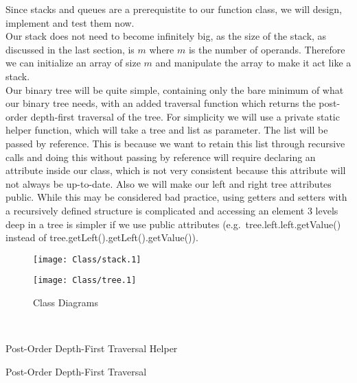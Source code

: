 \documentclass{article}
\newcounter{subsubsubsection}[subsubsection]
\begin{document}
\newpage
{}
Since stacks and queues are a prerequistite to our function class, we will design, implement and test them now.\\
Our stack does not need to become infinitely big, as the size of the stack, as discussed in the last section, is $m$ where $m$ is the number of operands. Therefore we can initialize an array of size $m$ and manipulate the array to make it act like a stack.\\
Our binary tree will be quite simple, containing only the bare minimum of what our binary tree needs, with an added traversal function which returns the post-order depth-first traversal of the tree. For simplicity we will use a private static helper function, which will take a tree and list as parameter. The list will be passed by reference. This is because we want to retain this list through recursive calls and doing this without passing by reference will require declaring an attribute inside our class, which is not very consistent because this attribute will not always be up-to-date. Also we will make our left and right tree attributes public. While this may be considered bad practice, using getters and setters with a recursively defined structure is complicated and accessing an element 3 levels deep in a tree is simpler if we use public attributes (e.g.\ tree.left.left.getValue() instead of tree.getLeft().getLeft().getValue()).\\
\begin{figure}[h]
\centering
\begin{minipage}{.5\textwidth}
  \centering
  \texttt{[image: Class/stack.1]}
\end{minipage}%
\begin{minipage}{.5\textwidth}
  \centering
  \texttt{[image: Class/tree.1]}
\end{minipage}
\caption{Class Diagrams}
\end{figure}
\\
\begin{algorithm}[H]
\caption{Post-Order Depth-First Traversal Helper}
\DontPrintSemicolon
{}
\end{algorithm}
\begin{algorithm}[H]
\caption{Post-Order Depth-First Traversal}
\DontPrintSemicolon
{}
\end{algorithm}
\end{document}
